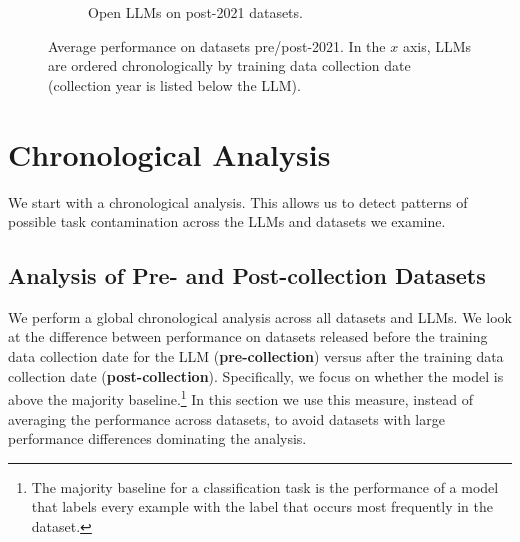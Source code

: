 \documentclass[letterpaper]{article} %
\newcommand{\jmf}[1]{}      %
\newcommand{\cm}[1]{}  %
\begin{document}
\begin{figure}[t]
\begin{subfigure}[b]{0.475\textwidth}
            \caption[]%
            {{Open LLMs on post-2021 datasets.}}
            \label{fig:Open-newdatasets}
        \end{subfigure}
        \caption[]
        {Average performance on datasets pre/post-2021.  In the $x$ axis, LLMs are ordered chronologically by training data collection date (collection year is listed below the LLM).%
        }
        \label{fig:experiments-average}
    \end{figure}







\section{Chronological Analysis}
\label{sec:chronological}
We start with a chronological analysis. This allows us to detect patterns of possible task contamination across the LLMs and datasets we examine.

\subsection{Analysis of Pre- and Post-collection Datasets}

We perform a global chronological analysis across all datasets and LLMs. We look at the difference between performance on datasets released before the training data collection date for the LLM (\textbf{pre-collection}) versus after the training data collection date (\textbf{post-collection}). Specifically, we focus on whether the model is above the majority baseline.\footnote{The majority baseline for a classification task is the performance of a model that labels every example with the label that occurs most frequently in the dataset.} In this section we use this measure, instead of averaging the performance across datasets, to avoid datasets with large performance differences dominating the analysis.
\end{document}
